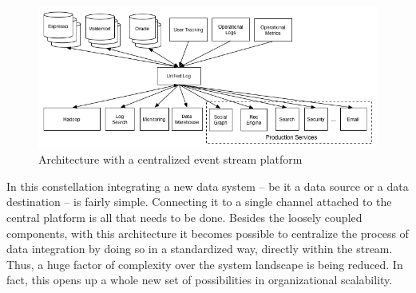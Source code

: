 \begin{figure}[H]
    \centering
    \includegraphics[width=1.0\textwidth]{images/datapipeline_simple.png}
    \caption{Architecture with a centralized event stream platform}
    \label{fig:datapipeline_simple}
\end{figure}

In this constellation integrating a new data system -- be it a data
source or a data destination -- is fairly simple. Connecting it to a single
channel attached to the central platform is all that needs to be done. Besides the
loosely coupled components, with this architecture it becomes possible to
centralize the process of data integration by doing so in a standardized way,
directly within the stream. Thus, a huge factor of complexity over the system
landscape is being reduced. In fact, this opens up a whole new set of
possibilities in organizational scalability. 

\newpage
